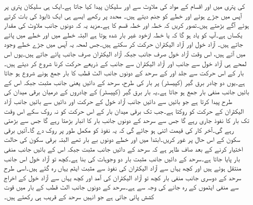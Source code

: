  کی پتری میں  اور  اقسام کے مواد کی ملاوٹ سے  اور  سلیکان پیدا کیا جاتا ہے۔ایک ہی سلیکان پتری پر آپس میں جڑے ہوئے  اور  خطے  کو جنم دیتے ہیں۔ محدد پر رکھے ایسے ہی ایک ڈایوڈ کی بات کرتے ہوئے آگے بڑھتے ہیں۔تصور کریں کہ  خطہ  اور  خطہ  قسم کا ہے۔مزید یہ کہ دونوں جانب ملاوٹ کی مقدار یکساں ہے۔آپ کو یاد ہو گا کہ  یا  خطہ ازخود غیر بار شدہ ہوتا ہے البتہ  خطے میں  اور  خطے میں  پائے جاتے ہیں۔ آزاد خول اور آزاد الیکٹران حرکت کر سکتے ہیں۔جس لمحہ یہ آپس میں جڑے خطے وجود میں آتے ہیں، اس وقت آزاد خول صرف  جانب جبکہ آزاد الیکٹران صرف  جانب پائے جاتے ہیں۔یوں اس لمحے ہی  آزاد خول  سے  جانب اور آزاد الیکٹران  سے  جانب   کے ذریعے حرکت کرنا شروع کر دیتے ہیں۔بار کے اس حرکت سے جلد  اور  کے سرحد کے دونوں جانب الٹ قطب کا بار جمع ہونے شروع ہو جاتا ہے۔یوں دو چادر برق گیر (کپیسٹر)  پر بار کی طرح، سرحد کے دائیں یعنی  جانب مثبت جبکہ اس کے بائیں جانب منفی بار جمع ہو جاتا ہے۔یہ بار برق گیر (کپیسٹر)  کے چادروں کے درمیان برقی میدان کی طرح  پیدا کرتا ہے جو بائیں سے دائیں جانب آزاد خول کے حرکت اور دائیں سے بائیں جانب آزاد الیکٹران کے حرکت  کو روکتا ہے۔جب تک برقی میدان  بار کے اس حرکت کو نہ روک سکے اس وقت تک بار کا نفوذ جاری رہے گا جس سے سرحد کے دونوں جانب بار کا انبار بڑھتا رہے گا جس سے  بڑھتی رہے گی۔آخر کار   کی قیمت اتنی ہو جائے گی کہ یہ نفوذ کو مکمل طور پر روک دے گا۔آئیں برقی سکون کے اس حال پر غور کریں۔ابتدا میں  اور  خطے دونوں بے بار تھے البتہ برقی سکون کی حالت اختیار کرنے کے بعد صاف ظاہر ہے کہ سرحد کے دائیں جانب مثبت جبکہ اس کے بائیں جانب منفی بار پایا جاتا ہے۔سرحد کے  دائیں جانب مثبت بار دو وجوہات کی بنا ہے۔کچھ تو آزاد خول اس جانب منتقل ہوئے ہیں اور کچھ یہاں سے آزاد الیکٹران کی نفوذ سے مثبت ایٹم یہاں رہ گئے ہیں۔اسی طرح سرحد کے دوسری جانب منفی بار کچھ تو آزاد الیکٹران کی آمد اور کچھ یہاں سے آزاد خول کے اخراج سے  منفی ایٹموں کے رہ جانے کی وجہ سے ہے۔سرحد کے دونوں جانب الٹ قطب کے بار میں قوت کشش پائی جاتی ہے جو انہیں سرحد کے قریب ہی رکھتے ہیں۔

